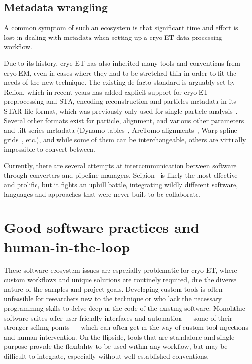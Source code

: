 \subsection{Metadata wrangling}

A common symptom of such an ecosystem is that significant time and effort is lost in dealing with metadata when setting up a cryo-ET data processing workflow.

Due to its history, cryo-ET has also inherited many tools and conventions from cryo-EM, even in cases where they had to be stretched thin in order to fit the needs of the new technique.
The existing de facto standard is arguably set by Relion, which in recent years has added explicit support for cryo-ET preprocessing and STA, encoding reconstruction and particles metadata in its STAR file format, which was previously only used for single particle analysis~\cite{zivanovBayesianApproachSingleparticle2022,burtImageProcessingPipeline2024}.
Several other formats exist for particle, alignment, and various other parameters and tilt-series metadata (Dynamo tables~\cite{castano-diezDynamoCatalogueGeometrical2017}, AreTomo alignments~\cite{zhengAreTomoIntegratedSoftware2022}, Warp spline grids~\cite{tegunovRealtimeCryoelectronMicroscopy2019}, etc.), and while some of them can be interchangeable, others are virtually impossible to convert between.

Currently, there are several attempts at intercommunication between software through converters and pipeline managers.
Scipion~\cite{delarosa-trevinScipionSoftwareFramework2016} is likely the most effective and prolific, but it fights an uphill battle, integrating wildly different software, languages and approaches that were never built to be collaborate.


\section{Good software practices and human-in-the-loop}

These software ecosystem issues are especially problematic for cryo-ET, where custom workflows and unique solutions are routinely required, due the diverse nature of the samples and project goals.
Developing custom tools is often unfeasible for researchers new to the technique or who lack the necessary programming skills to delve deep in the code of the existing software.
Monolithic software suites offer user-friendly interfaces and automation --- some of their stronger selling points --- which can often get in the way of custom tool injections and human intervention.
On the flipside, tools that are standalone and single-purpose provide the flexibility to be used within any workflow, but may be difficult to integrate, especially without well-established conventions.

